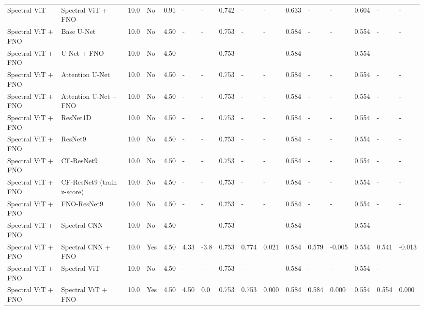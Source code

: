 \begin{longtable}{llllllllllllllll}
Spectral ViT & Spectral ViT + FNO & 10.0 & No & 0.91 & - & - & 0.742 & - & - & 0.633 & - & - & 0.604 & - & - \\
Spectral ViT + FNO & Base U-Net & 10.0 & No & 4.50 & - & - & 0.753 & - & - & 0.584 & - & - & 0.554 & - & - \\
Spectral ViT + FNO & U-Net + FNO & 10.0 & No & 4.50 & - & - & 0.753 & - & - & 0.584 & - & - & 0.554 & - & - \\
Spectral ViT + FNO & Attention U-Net & 10.0 & No & 4.50 & - & - & 0.753 & - & - & 0.584 & - & - & 0.554 & - & - \\
Spectral ViT + FNO & Attention U-Net + FNO & 10.0 & No & 4.50 & - & - & 0.753 & - & - & 0.584 & - & - & 0.554 & - & - \\
Spectral ViT + FNO & ResNet1D & 10.0 & No & 4.50 & - & - & 0.753 & - & - & 0.584 & - & - & 0.554 & - & - \\
Spectral ViT + FNO & ResNet9 & 10.0 & No & 4.50 & - & - & 0.753 & - & - & 0.584 & - & - & 0.554 & - & - \\
Spectral ViT + FNO & CF-ResNet9 & 10.0 & No & 4.50 & - & - & 0.753 & - & - & 0.584 & - & - & 0.554 & - & - \\
Spectral ViT + FNO & CF-ResNet9 (train z-score) & 10.0 & No & 4.50 & - & - & 0.753 & - & - & 0.584 & - & - & 0.554 & - & - \\
Spectral ViT + FNO & FNO-ResNet9 & 10.0 & No & 4.50 & - & - & 0.753 & - & - & 0.584 & - & - & 0.554 & - & - \\
Spectral ViT + FNO & Spectral CNN & 10.0 & No & 4.50 & - & - & 0.753 & - & - & 0.584 & - & - & 0.554 & - & - \\
Spectral ViT + FNO & Spectral CNN + FNO & 10.0 & Yes & 4.50 & 4.33 & -3.8 & 0.753 & 0.774 & 0.021 & 0.584 & 0.579 & -0.005 & 0.554 & 0.541 & -0.013 \\
Spectral ViT + FNO & Spectral ViT & 10.0 & No & 4.50 & - & - & 0.753 & - & - & 0.584 & - & - & 0.554 & - & - \\
Spectral ViT + FNO & Spectral ViT + FNO & 10.0 & Yes & 4.50 & 4.50 & 0.0 & 0.753 & 0.753 & 0.000 & 0.584 & 0.584 & 0.000 & 0.554 & 0.554 & 0.000 \\
\end{longtable}
